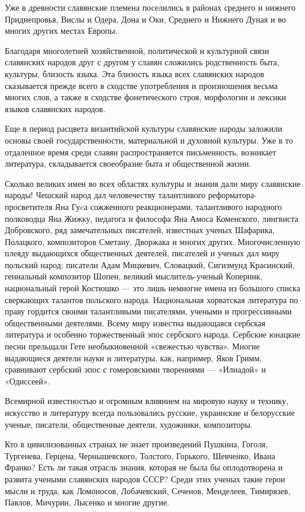 \documentclass[12pt, a4paper, openany]{book}
\begin{document}
Уже в древности славянские племена поселились в районах среднего и нижнего Приднепровья, Вислы и Одера, Дона и Оки, Среднего и Нижнего Дуная и во многих других местах Европы.

Благодаря многолетней хозяйственной, политической и культурной связи славянских народов друг с другом у славян сложились родственность быта, культуры, близость языка. Эта близость языка всех славянских народов сказывается прежде всего в сходстве употребления и произношения весьма многих слов, а также в сходстве фонетического строя, морфологии и лексики языков славянских народов.

Еще в период расцвета византийской культуры славянские народы заложили основы своей государственности, материальной и духовной культуры. Уже в то отдаленное время среди славян распространяется письменность, возникает литература, складывается своеобразие быта и общественной жизни.

Сколько великих имен во всех областях культуры и знания дали миру славянские народы! Чешский народ дал человечеству талантливого реформатора-просветителя Яна Гуcа сожженного реакционерами, талантливого народного полководца Яна Жижку, педагога и философа Яна Амоса Коменского, лингвиста Добровского, ряд замечательных писателей, известных ученых Шафарика, Полацкого, композиторов Сметану, Дворжака и многих других. Многочисленную плеяду выдающихся общественных деятелей, писателей и ученых дал миру польский народ: писатели Адам Мицкевич, Словацкий, Сигизмунд Красинский, гениальный композитор Шопен, великий мыслитель-ученый Коперник, национальный герой Костюшко — это лишь немногие имена из большого списка сверкающих талантов польского народа. Национальная хорватская литература по праву гордится своими талантливыми писателями, учеными и прогрессивными общественными деятелями. Всему миру известна выдающаяся сербская литература и особенно торжественный эпос сербского народа. Сербские юнацкие песни прельщали Гете необыкновенной «свежестью чувства». Многие выдающиеся деятели науки и литературы, как, например, Яков Гримм, сравнивают сербский эпос с гомеровскими творениями — «Илиадой» и «Одиссеей».

Всемирной известностью и огромным влиянием на мировую науку и технику, искусство и литературу всегда пользовались русские, украинские и белорусские ученые, писатели, общественные деятели, художники, композиторы.

Кто в цивилизованных странах не знает произведений Пушкина, Гоголя, Тургенева, Герцена, Чернышевского, Толстого, Горького, Шевченко, Ивана Франко? Есть ли такая отрасль знания, которая не была бы оплодотворена и развита учеными славянских народов СССР? Среди этих ученых такие герои мысли и труда, как Ломоносов, Лобачевский, Сеченов, Менделеев, Тимирязев, Павлов, Мичурин, Лысенко и многие другие.
\end{document}
